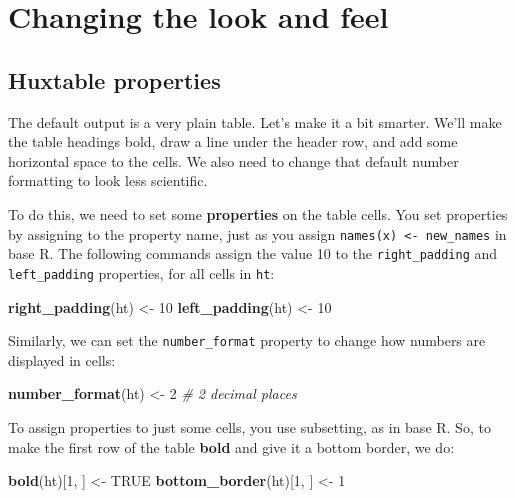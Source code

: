 \documentclass[]{article}
\newenvironment{Shaded}{\begin{snugshade}}{\end{snugshade}}
\newcommand{\KeywordTok}[1]{\textcolor[rgb]{0.13,0.29,0.53}{\textbf{#1}}}
\newcommand{\DecValTok}[1]{\textcolor[rgb]{0.00,0.00,0.81}{#1}}
\newcommand{\StringTok}[1]{\textcolor[rgb]{0.31,0.60,0.02}{#1}}
\newcommand{\CommentTok}[1]{\textcolor[rgb]{0.56,0.35,0.01}{\textit{#1}}}
\newcommand{\OtherTok}[1]{\textcolor[rgb]{0.56,0.35,0.01}{#1}}
\newcommand{\NormalTok}[1]{#1}
\begin{document}
\FloatBarrier

\section{Changing the look and feel}\label{changing-the-look-and-feel}

\subsection{Huxtable properties}\label{huxtable-properties}

The default output is a very plain table. Let's make it a bit smarter.
We'll make the table headings bold, draw a line under the header row,
and add some horizontal space to the cells. We also need to change that
default number formatting to look less scientific.

To do this, we need to set some \textbf{properties} on the table cells.
You set properties by assigning to the property name, just as you assign
\texttt{names(x)\ \textless{}-\ new\_names} in base R. The following
commands assign the value 10 to the \texttt{right\_padding} and
\texttt{left\_padding} properties, for all cells in \texttt{ht}:

\begin{Shaded}
\begin{Highlighting}[]
\KeywordTok{right_padding}\NormalTok{(ht) <-}\StringTok{ }\DecValTok{10}
\KeywordTok{left_padding}\NormalTok{(ht)  <-}\StringTok{ }\DecValTok{10}
\end{Highlighting}
\end{Shaded}

\FloatBarrier

Similarly, we can set the \texttt{number\_format} property to change how
numbers are displayed in cells:

\begin{Shaded}
\begin{Highlighting}[]
\KeywordTok{number_format}\NormalTok{(ht) <-}\StringTok{ }\DecValTok{2}    \CommentTok{# 2 decimal places}
\end{Highlighting}
\end{Shaded}

\FloatBarrier

To assign properties to just some cells, you use subsetting, as in base
R. So, to make the first row of the table \textbf{bold} and give it a
bottom border, we do:

\begin{Shaded}
\begin{Highlighting}[]
\KeywordTok{bold}\NormalTok{(ht)[}\DecValTok{1}\NormalTok{, ]          <-}\StringTok{ }\OtherTok{TRUE}
\KeywordTok{bottom_border}\NormalTok{(ht)[}\DecValTok{1}\NormalTok{, ] <-}\StringTok{ }\DecValTok{1}
\end{Highlighting}
\end{Shaded}
\end{document}
